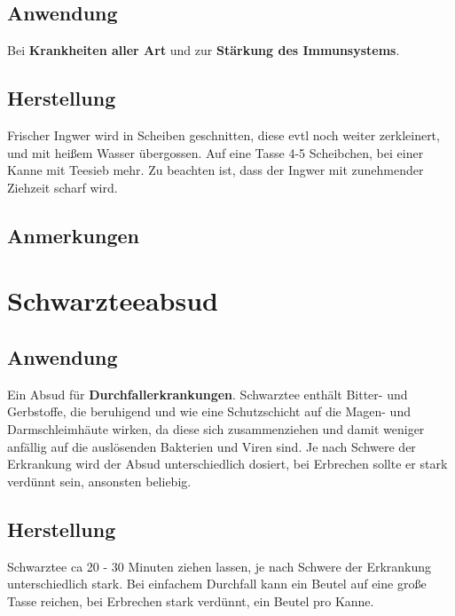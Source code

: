 \subsection{Anwendung}

Bei \textbf{Krankheiten aller Art} und zur \textbf{Stärkung des Immunsystems}.

\subsection{Herstellung}

Frischer Ingwer wird in Scheiben geschnitten, diese evtl noch weiter zerkleinert, und mit heißem Wasser übergossen. Auf eine Tasse 4-5 Scheibchen, bei einer Kanne mit Teesieb mehr. Zu beachten ist, dass der Ingwer mit zunehmender Ziehzeit scharf wird.

\subsection{Anmerkungen}


\newpage



\section{Schwarzteeabsud}


\subsection{Anwendung}

Ein Absud für \textbf{Durchfallerkrankungen}. Schwarztee enthält Bitter- und Gerbstoffe, die beruhigend und wie eine Schutzschicht auf die Magen- und Darmschleimhäute wirken, da diese sich zusammenziehen und damit weniger anfällig auf die auslösenden Bakterien und Viren sind. Je nach Schwere der Erkrankung wird der Absud unterschiedlich dosiert, bei Erbrechen sollte er stark verdünnt sein, ansonsten beliebig.

\subsection{Herstellung}

Schwarztee ca 20 - 30 Minuten ziehen lassen, je nach Schwere der Erkrankung unterschiedlich stark. Bei einfachem Durchfall kann ein Beutel auf eine große Tasse reichen, bei Erbrechen stark verdünnt, ein Beutel pro Kanne.

